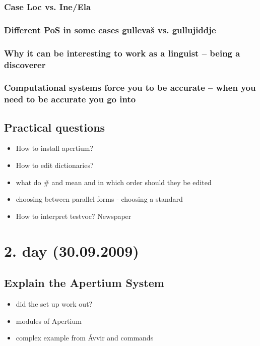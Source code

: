 \documentclass[a4paper,english,12pt]{article}
\begin{document}
\subsubsection{Case Loc vs. Ine/Ela}
\subsubsection{Different PoS in some cases gullevaš vs. gullujiddje}
\subsubsection{Why it can be interesting to work as a linguist -- being a discoverer}
\subsubsection{Computational systems force you to be accurate -- when you need to be accurate you go into} 



\subsection{Practical questions}

\begin{itemize}
\item How to install apertium?
\item    How to edit dictionaries?
\item what do \# \* \@ and \/ mean and in which order should they be edited
\item choosing between parallel forms - choosing a standard
\item    How to interpret testvoc? Newspaper
\end{itemize}


\section{2. day (30.09.2009)}

\subsection{Explain the Apertium System}

\begin{itemize}
\item did the set up work out?
\item modules of Apertium
\item complex example from Ávvir and commands
\end{itemize}
\end{document}
